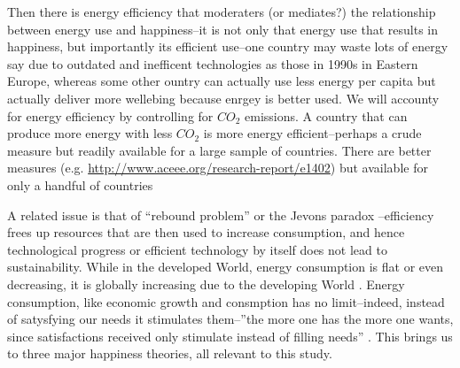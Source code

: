 \documentclass[10pt, letterpaper]{article}
\begin{document}
\begin{spacing}{1.4}
Then there is energy efficiency that moderaters (or mediates?) the relationship
between energy use and happiness--it is not only that energy use that results in
happiness, but importantly its efficient use--one country may waste lots of
energy say due to outdated and inefficent technologies as those in 1990s in
Eastern Europe, whereas some other ountry can actually use less energy per
capita but actually deliver more wellebing because enrgey is better used. We
will accounty for  energy efficiency by controlling for  $CO_2$ emissions. 
 A country that can produce more energy with less $CO_2$ is more energy
 efficient--perhaps a crude measure but readily available for a large sample of
 countries. There are better measures (e.g. \url{http://www.aceee.org/research-report/e1402}) but available for only a handful of countries

A related issue is that of ``rebound problem'' or the Jevons paradox
\citep{pretty13}%
--efficiency frees up resources that are then used to increase consumption, and
hence technological progress or efficient technology by itself does not lead to
sustainability. While in the developed World, energy consumption is flat or even
decreasing, it is globally increasing due to the developing World
\citep{pretty13}. Energy consumption, like economic growth and consmption has no
limit--indeed, instead of satysfying our needs it stimulates them--''the more
one has the more one wants, since satisfactions received only stimulate instead
of filling needs''   \citep{durkheim50}. This brings us to three major happiness
theories, all relevant to this study. 





\end{spacing}
\end{document}
